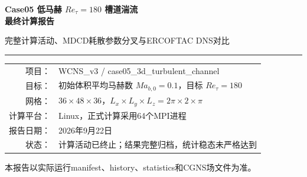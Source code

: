 \documentclass[UTF8,12pt,a4paper,fontset=fandol]{ctexart}
\newcommand{\Retau}{Re_{\tau}}
\newcommand{\CampaignAdvancedSteps}{2,272,188}
\newcommand{\CampaignWallHours}{276.56}
\newcommand{\CampaignCoreHours}{17699.6}
\newcommand{\CampaignStorageGiB}{1.39}
\newcommand{\CampaignFieldCount}{114}
\newcommand{\CampaignCheckpointCount}{118}
\begin{document}
\begin{titlepage}
  \centering
  \vspace*{20mm}
  {\Huge\bfseries Case05 低马赫 $\Retau=180$ 槽道湍流\\[4mm]最终计算报告\par}
  \vspace{8mm}
  {\Large 完整计算活动、MDCD耗散参数分叉与ERCOFTAC DNS对比\par}
  \vspace{20mm}
  \rule{0.78\textwidth}{0.8pt}\par
  \vspace{10mm}
  \begin{tabular}{rl}
    项目： & WCNS\_v3 / case05\_3d\_turbulent\_channel \\
    目标： & 初始体积平均马赫数 $Ma_{b,0}=0.1$，目标 $\Retau=180$ \\
    网格： & $36\times48\times36$，$L_x\times L_y\times L_z=2\pi\times2\times\pi$ \\
    计算平台： & Linux，正式计算采用64个MPI进程 \\
    报告日期： & 2026年9月22日 \\
    状态： & 计算活动已终止；结果完整归档，统计稳态未严格达到
  \end{tabular}
  \vfill
  {\large 本报告以实际运行manifest、history、statistics和CGNS场文件为准。\par}
\end{titlepage}

\begin{abstract}
本报告汇总Case05从人工低马赫湍流初场、4核可行性卡口、两段64核基线计算，
到在$t=223.003107849$处分叉得到的两套MDCD耗散参数计算的全部结果。基线实际采用
SCMM6-WCNS、MDCD-linear原始变量重构和Roe通量，推进至$t=223.0031$；随后保持
其余参数不变，分别令MDCD耗散系数为0.001和0.01，最终推进至$t=439.7373$和
$t=325.5531$。全部正式计算共执行\CampaignAdvancedSteps 个推进步，累计
\CampaignWallHours{} h墙钟时间、约\CampaignCoreHours{}核时，保存
\CampaignFieldCount 个三维场和\CampaignCheckpointCount 个编号检查点，占用约
\CampaignStorageGiB{} GiB（不含分析副本）。

所有续算连接点的时间、步数和完整状态统计均精确连续；总质量相对漂移量级低于
$6\times10^{-11}$，未发生重构/Riemann fallback、troubled cell、局部重算或步重试，
因此计算在数值上健康。两条分支最终仍存在可测的流量趋势、壁面剪切失配或低频
$\Retau$变化，故不能宣称达到严格统计稳态。

与ERCOFTAC Case 032的Kim--Moin--Moser $\Retau=180$ DNS比较表明：在双方严格共同的
$t=300,305,\ldots,325$六场窗口内，耗散系数0.001的$U^+$、三个速度RMS和
$-\langle u'v'\rangle^+$相对$L_2$误差分别为4.14\%、4.57\%、5.95\%、2.28\%和
9.41\%；耗散系数0.01分别为13.74\%、24.07\%、16.12\%、6.76\%和11.69\%。
0.01仅在窗口平均$\Retau$上更接近180。综合所有数据，0.001是当前更接近DNS的
参数，但由于计算在未严格统计收敛时终止，该判断应理解为本次有限时间计算的结果，
而不是无不确定度的最终算法标定。
\end{abstract}
\end{document}
